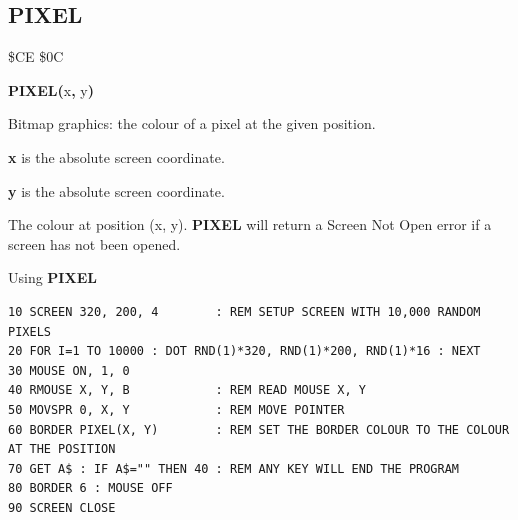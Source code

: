 
\newpage
\subsection{PIXEL}
\begin{description}[leftmargin=2cm,style=nextline]
\item [Token:]    \$CE \$0C

\item [Format:]   {\bf PIXEL(}x{\bf,} y{\bf)}

\item [Usage:]    Bitmap graphics: the colour of a pixel at the given position.

                  {\bf x} is the absolute screen coordinate.

                  {\bf y} is the absolute screen coordinate.

\item [Returns:]  The colour at position (x, y). {\bf PIXEL} will return a Screen Not Open error if a screen has not been opened.

\item [Example:]  Using {\bf PIXEL}

\begin{tcolorbox}[colback=black,coltext=white]
\verbatimfont{\codefont}
\begin{verbatim}
10 SCREEN 320, 200, 4        : REM SETUP SCREEN WITH 10,000 RANDOM PIXELS
20 FOR I=1 TO 10000 : DOT RND(1)*320, RND(1)*200, RND(1)*16 : NEXT
30 MOUSE ON, 1, 0
40 RMOUSE X, Y, B            : REM READ MOUSE X, Y
50 MOVSPR 0, X, Y            : REM MOVE POINTER
60 BORDER PIXEL(X, Y)        : REM SET THE BORDER COLOUR TO THE COLOUR AT THE POSITION
70 GET A$ : IF A$="" THEN 40 : REM ANY KEY WILL END THE PROGRAM
80 BORDER 6 : MOUSE OFF
90 SCREEN CLOSE
\end{verbatim}
\end{tcolorbox}
\end{description}


\newpage
